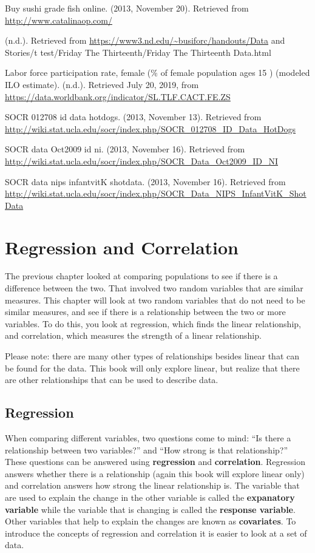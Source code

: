 \documentclass[
]{book}
\begin{document}
Buy sushi grade fish online. (2013, November 20). Retrieved from \url{http://www.catalinaop.com/}

(n.d.). Retrieved from \url{https://www3.nd.edu/~busiforc/handouts/Data} and Stories/t test/Friday The Thirteenth/Friday The Thirteenth Data.html

Labor force participation rate, female (\% of female population ages 15 ) (modeled ILO estimate). (n.d.). Retrieved July 20, 2019, from \url{https://data.worldbank.org/indicator/SL.TLF.CACT.FE.ZS}

SOCR 012708 id data hotdogs. (2013, November 13). Retrieved from
\url{http://wiki.stat.ucla.edu/socr/index.php/SOCR_012708_ID_Data_HotDogs}

SOCR data Oct2009 id ni. (2013, November 16). Retrieved from
\url{http://wiki.stat.ucla.edu/socr/index.php/SOCR_Data_Oct2009_ID_NI}

SOCR data nips infantvitK shotdata. (2013, November 16). Retrieved from
\url{http://wiki.stat.ucla.edu/socr/index.php/SOCR_Data_NIPS_InfantVitK_ShotData}

\hypertarget{regression-and-correlation}{%
\chapter{Regression and Correlation}\label{regression-and-correlation}}

The previous chapter looked at comparing populations to see if there is a difference between the two. That involved two random variables that are similar measures. This chapter will look at two random variables that do not need to be similar measures, and see if there is a relationship between the two or more variables. To do this, you look at regression, which finds the linear relationship, and correlation, which measures the strength of a linear relationship.

Please note: there are many other types of relationships besides linear that can be found for the data. This book will only explore linear, but realize that there are other relationships that can be used to describe data.

\hypertarget{regression}{%
\section{Regression}\label{regression}}

When comparing different variables, two questions come to mind: ``Is there a relationship between two variables?'' and ``How strong is that relationship?'' These questions can be answered using \textbf{regression} and \textbf{correlation}. Regression answers whether there is a relationship (again this book will explore linear only) and correlation answers how strong the linear relationship is. The variable that are used to explain the change in the other variable is called the \textbf{expanatory variable} while the variable that is changing is called the \textbf{response variable}. Other variables that help to explain the changes are known as \textbf{covariates}. To introduce the concepts of regression and correlation it is easier to look at a set of data.
\end{document}
